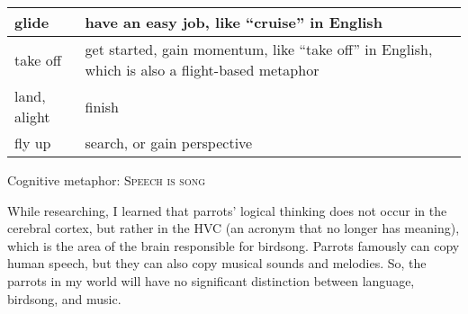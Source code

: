 \documentclass[12pt]{article}
\begin{document}
\begin{itemize}
        \begin{center}
            \begin{tabular}{b{5em} b{27em}}
                \hline
                glide        & have an easy job, like ``cruise'' in English                                                    \\
                \hline
                take off     & get started, gain momentum, like ``take off'' in English, which is also a flight-based metaphor \\
                \hline
                land, alight & finish                                                                                          \\
                \hline
                fly up       & search, or gain perspective                                                                     \\
                \hline
            \end{tabular}
        \end{center}

    \end{itemize}

    \newpage
    Cognitive metaphor: \textsc{Speech is song}

    While researching, I learned that parrots' logical thinking does not occur in the cerebral cortex,
    but rather in the HVC (an acronym that no longer has meaning),
    which is the area of the brain responsible for birdsong.
    Parrots famously can copy human speech,
    but they can also copy musical sounds and melodies.
    So, the parrots in my world will have no significant distinction between language, birdsong, and music.
\end{document}
